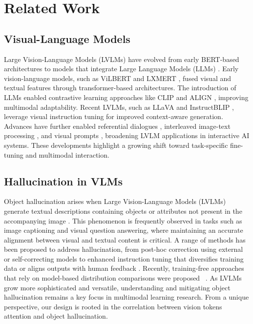 \section{Related Work}
\subsection{Visual-Language Models}
Large Vision-Language Models (LVLMs) have evolved from early BERT-based architectures \cite{devlin2018bert,lu2019vilbert,chen2019uniter} to models that integrate Large Language Models (LLMs) \cite{bai2023qwen,brown2020language,gilardi2023chatgpt,raffel2020exploring,taori2023stanford}. Early vision-language models, such as ViLBERT \cite{lu2019vilbert} and LXMERT \cite{tan2019lxmert}, fused visual and textual features through transformer-based architectures. The introduction of LLMs enabled contrastive learning approaches like CLIP \cite{radford2021clip} and ALIGN \cite{jia2021scaling}, improving multimodal adaptability. Recent LVLMs, such as LLaVA \cite{liu2024visual} and InstructBLIP \cite{dai2024instructblip}, leverage visual instruction tuning for improved context-aware generation. Advances have further enabled referential dialogues \cite{chen2023shikra,you2023ferret,zhang2023gpt4roi}, interleaved image-text processing \cite{alayrac2022flamingo,awadalla2023openflamingo}, and visual prompts \cite{peng2023kosmos,zhang2023prompt,chen2023llava}, broadening LVLM applications in interactive AI systems. These developments highlight a growing shift toward task-specific fine-tuning and multimodal interaction.

\subsection{Hallucination in VLMs}
Object hallucination arises when Large Vision-Language Models (LVLMs) generate textual descriptions containing objects or attributes not present in the accompanying image \cite{cui2023holistic,liu2024survey,guan2023hallusionbench,li2023evaluating,wang2024mementos,nie2024mmrel}. This phenomenon is frequently observed in tasks such as image captioning and visual question answering, where maintaining an accurate alignment between visual and textual content is critical. A range of methods has been proposed to address hallucination, from post-hoc correction using external or self-correcting models \cite{shukang2023woodpecker,zhou2024object,lee2023volcano} to enhanced instruction tuning that diversifies training data or aligns outputs with human feedback \cite{liu2024mitigating,yu2024hallucidoctor,sun2023aligning}. Recently, training-free approaches that rely on model-based distribution comparisons were proposed ~\cite{sicong2023vcd, huo2024sid,qidong2023opera}. As LVLMs grow more sophisticated and versatile, understanding and mitigating object hallucination remains a key focus in multimodal learning research. From a unique perspective, our design is rooted in the correlation between vision tokens attention and object hallucination.